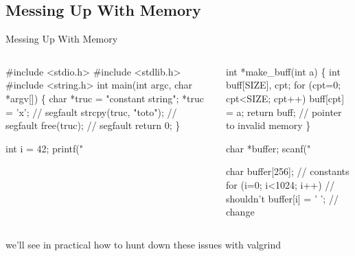 \subsection{Messing Up With Memory}
\begin{frame}[fragile]{Messing Up With Memory}
  \begin{columns}
    \begin{column}{.4\linewidth}
  \begin{boitecode}{}
#include <stdio.h>
#include <stdlib.h>
#include <string.h>
int main(int argc, char *argv[]) \{
  char *truc = "constant string";
  *truc = 'x';          \alert{// segfault}
  strcpy(truc, "toto"); \alert{// segfault}
  free(truc);           \alert{// segfault}
  return 0;
\}
  \end{boitecode}    
 
  \begin{boitecode}{}
  int i = 42;
  printf("%
  \end{boitecode}
    \end{column}
    \begin{column}{.46\linewidth}
      \begin{boitecode}{}
int *make_buff(int a) \{
  int buff[SIZE], cpt;
  for (cpt=0; cpt<SIZE; cpt++) 
    buff[cpt] = a;
  return buff; \alert{// pointer to invalid memory}
\}
      \end{boitecode}

      \begin{boitecode}{}
  char *buffer;
  scanf("%
      \end{boitecode}
      \bigskip

      \begin{boitecode}{}
  char buffer[256];      \alert{// constants }
  for (i=0; i<1024; i++) \alert{//   shouldn't}
     buffer[i] = ' ';    \alert{//     change}
      \end{boitecode}
    \end{column}
\end{columns}

  \bigskip
  \bigskip
  \bigskip

  \centerline{we'll see in practical how to hunt down these issues with valgrind}
\end{frame}
    
